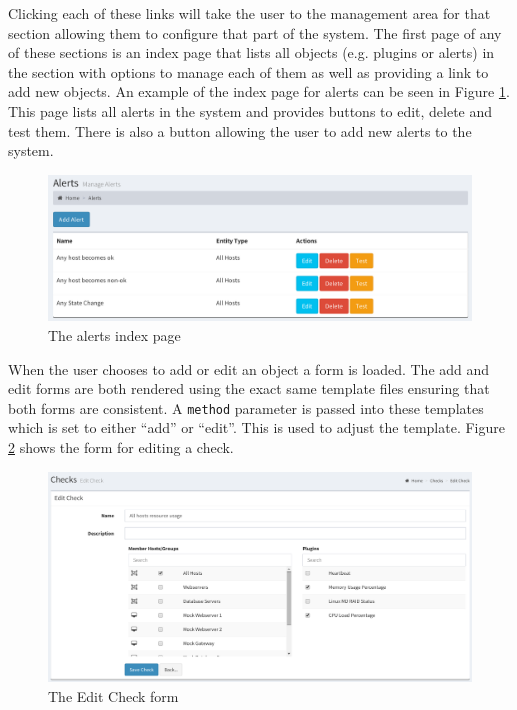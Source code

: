 \documentclass[bsc,logo,twoside,parskip,singlespacing,notimes]{infthesis}
\begin{document}
	Clicking each of these links will take the user to the management area for
	that section allowing them to configure that part of the system.  The first
	page of any of these sections is an index page that lists all objects (e.g.
	plugins or alerts) in the section with options to manage each of them as well
	as providing a link to add new objects.  An example of the index page for
	alerts can be seen in Figure \ref{alerts-index}.  This page lists all alerts
	in the system and provides buttons to edit, delete and test them. There is
	also a button allowing the user to add new alerts to the system.

\begin{figure}[H]
	\caption{The alerts index page}
	\label{alerts-index}
	\includegraphics[scale=0.55]{assets/screenshots/alerts-index.pdf}
\end{figure}


	When the user chooses to add or edit an object a form is loaded.  The add and
	edit forms are both rendered using the exact same template files ensuring that
	both forms are consistent.  A \texttt{method} parameter is passed into these
	templates which is set to either ``add'' or ``edit''.  This is used to adjust the
	template.  Figure \ref{edit-check} shows the form for editing a check.

\begin{figure}[H]
	\caption{The Edit Check form}
	\label{edit-check}
	\includegraphics[scale=0.45]{assets/screenshots/edit-check.pdf}
\end{figure}
\end{document}
